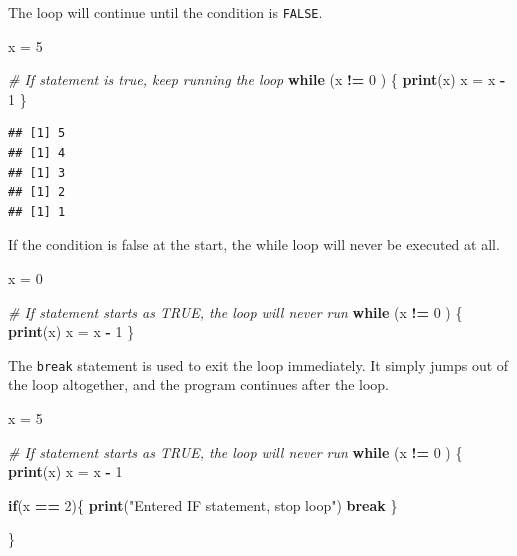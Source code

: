 \documentclass[
]{book}
\newenvironment{Shaded}{\begin{snugshade}}{\end{snugshade}}
\newcommand{\CommentTok}[1]{\textcolor[rgb]{0.56,0.35,0.01}{\textit{#1}}}
\newcommand{\ControlFlowTok}[1]{\textcolor[rgb]{0.13,0.29,0.53}{\textbf{#1}}}
\newcommand{\DecValTok}[1]{\textcolor[rgb]{0.00,0.00,0.81}{#1}}
\newcommand{\KeywordTok}[1]{\textcolor[rgb]{0.13,0.29,0.53}{\textbf{#1}}}
\newcommand{\NormalTok}[1]{#1}
\newcommand{\OperatorTok}[1]{\textcolor[rgb]{0.81,0.36,0.00}{\textbf{#1}}}
\newcommand{\StringTok}[1]{\textcolor[rgb]{0.31,0.60,0.02}{#1}}
\begin{document}
The loop will continue until the condition is \texttt{FALSE}.

\begin{Shaded}
\begin{Highlighting}[]
\NormalTok{x =}\StringTok{ }\DecValTok{5}

\CommentTok{# If statement is true, keep running the loop }
\ControlFlowTok{while}\NormalTok{ (x }\OperatorTok{!=}\StringTok{ }\DecValTok{0}\NormalTok{ ) \{}
  \KeywordTok{print}\NormalTok{(x)}
\NormalTok{  x =}\StringTok{ }\NormalTok{x }\OperatorTok{-}\StringTok{ }\DecValTok{1}
\NormalTok{\}}
\end{Highlighting}
\end{Shaded}

\begin{verbatim}
## [1] 5
## [1] 4
## [1] 3
## [1] 2
## [1] 1
\end{verbatim}

If the condition is false at the start, the while loop will never be executed at all.

\begin{Shaded}
\begin{Highlighting}[]
\NormalTok{x =}\StringTok{ }\DecValTok{0}

\CommentTok{# If statement starts as TRUE,  the loop will never run }
\ControlFlowTok{while}\NormalTok{ (x }\OperatorTok{!=}\StringTok{ }\DecValTok{0}\NormalTok{ ) \{}
  \KeywordTok{print}\NormalTok{(x)}
\NormalTok{  x =}\StringTok{ }\NormalTok{x }\OperatorTok{-}\StringTok{ }\DecValTok{1}
\NormalTok{\}}
\end{Highlighting}
\end{Shaded}

The \texttt{break} statement is used to exit the loop immediately. It simply jumps out of the loop altogether, and the program continues after the loop.

\begin{Shaded}
\begin{Highlighting}[]
\NormalTok{x =}\StringTok{ }\DecValTok{5}

\CommentTok{# If statement starts as TRUE,  the loop will never run }
\ControlFlowTok{while}\NormalTok{ (x }\OperatorTok{!=}\StringTok{ }\DecValTok{0}\NormalTok{ ) \{}
  \KeywordTok{print}\NormalTok{(x)}
\NormalTok{  x =}\StringTok{ }\NormalTok{x }\OperatorTok{-}\StringTok{ }\DecValTok{1}
  
  \ControlFlowTok{if}\NormalTok{(x }\OperatorTok{==}\StringTok{ }\DecValTok{2}\NormalTok{)\{}
    \KeywordTok{print}\NormalTok{(}\StringTok{"Entered IF statement, stop loop"}\NormalTok{)}
    \ControlFlowTok{break} 
\NormalTok{  \}}
  
\NormalTok{\}}
\end{Highlighting}
\end{Shaded}
\end{document}
